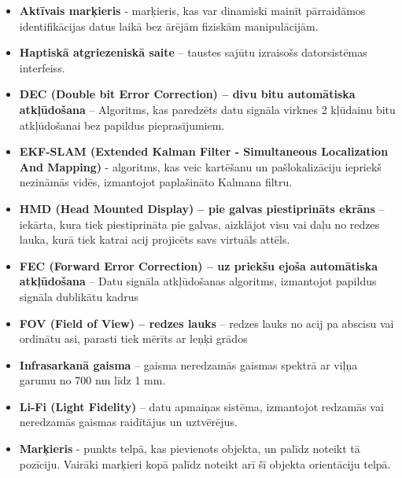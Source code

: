 \documentclass[12pt, a4paper, oneside, openright]{article}
\begin{document}
\begin{itemize}


\item \textbf{Aktīvais marķieris} - marķieris, kas var dinamiski mainīt pārraidāmos identifikācijas datus laikā bez ārējām fiziskām manipulācijām.

\item \textbf{Haptiskā atgriezeniskā saite} – taustes sajūtu izraisošs datorsistēmas interfeiss.

\item \textbf{DEC (Double bit Error Correction) – divu bitu automātiska atkļūdošana} – 
Algoritms, kas paredzēts datu signāla virknes 2 kļūdainu bitu atkļūdošanai bez papildus pieprasījumiem.

\item \textbf{EKF-SLAM (Extended Kalman Filter - Simultaneous Localization And Mapping)} - algoritms, kas veic kartēšanu un pašlokalizāciju iepriekš nezināmās vidēs, izmantojot paplašināto Kalmana filtru.

\item \textbf{HMD (Head Mounted Display) – pie galvas piestiprināts ekrāns } – iekārta, kura tiek piestiprināta pie galvas, aizklājot visu vai daļu no redzes lauka, kurā tiek katrai acij projicēts savs virtuāls attēls.

\item \textbf{FEC (Forward Error Correction) – uz priekšu ejoša automātiska atkļūdošana} – 
Datu signāla atkļūdošanas algoritms, izmantojot papildus signāla dublikātu kadrus

\item \textbf{FOV (Field of View) – redzes lauks} – redzes lauks no acij pa abscisu vai ordinātu asi, parasti tiek mērīts ar leņķi grādos

\item \textbf{Infrasarkanā gaisma} – gaisma neredzamās gaismas spektrā ar viļņa garumu no 700 nm līdz 1 mm.

\item \textbf{Li-Fi (Light Fidelity)} – datu apmaiņas sistēma, izmantojot redzamās vai neredzamās gaismas raidītājus un uztvērējus.

\item \textbf{Marķieris} - punkts telpā, kas pievienots objekta, un palīdz noteikt tā pozīciju. Vairāki marķieri kopā palīdz noteikt arī šī objekta orientāciju telpā. 


\end{itemize}
\end{document}
